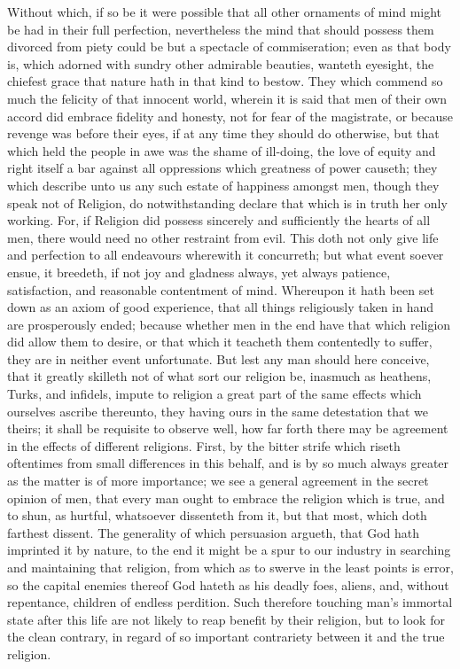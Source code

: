 Without which, if so be it were possible that all other ornaments of mind might be had in their full perfection, nevertheless the mind that should possess them divorced from piety could be but a spectacle of commiseration; even as that body is, which adorned with sundry other admirable beauties, wanteth eyesight, the chiefest grace that nature hath in that kind to bestow. They which commend so much the felicity of that innocent world, wherein it is said that men of their own accord did embrace fidelity and honesty, not for fear of the magistrate, or because revenge was before their eyes, if at any time they  should do otherwise, but that which held the people in awe was the shame of ill-doing, the love of equity and right itself a bar against all oppressions which greatness of power causeth; they which describe unto us any such estate of happiness amongst men, though they speak not of Religion, do notwithstanding declare that which is in truth her only working. For, if Religion did possess sincerely and sufficiently the hearts of all men, there would need no other restraint from evil. This doth not only give life and perfection to all endeavours wherewith it concurreth; but what event soever ensue, it breedeth, if not joy and gladness always, yet always patience, satisfaction, and reasonable contentment of mind. Whereupon it hath been set down as an axiom of good experience, that all things religiously taken in hand are prosperously ended; because whether men in the end have that which religion did allow them to desire, or that which it teacheth them contentedly to suffer, they are in neither event unfortunate.
But lest any man should here conceive, that it greatly skilleth not of what sort our religion be, inasmuch as heathens, Turks, and infidels, impute to religion a great part of the same effects which ourselves ascribe thereunto, they having ours in the same detestation that we theirs; it shall be requisite to observe well, how far forth there may be agreement in the effects of different religions. First, by the bitter strife which riseth oftentimes from small differences in this behalf, and is by so much always greater as the matter is of more importance; we see a general agreement in the secret opinion of men, that every man ought to embrace the religion which is true, and to shun, as hurtful, whatsoever dissenteth from it, but that most, which doth farthest dissent. The generality of which persuasion argueth, that God hath imprinted it by nature, to the end it might be a spur to our industry in searching and maintaining that religion, from which as to swerve in the least points is error, so the capital enemies thereof God hateth as his deadly foes, aliens, and, without repentance, children of endless perdition. Such therefore touching man’s immortal state after this life are not likely to reap benefit by their  religion, but to look for the clean contrary, in regard of so important contrariety between it and the true religion.
